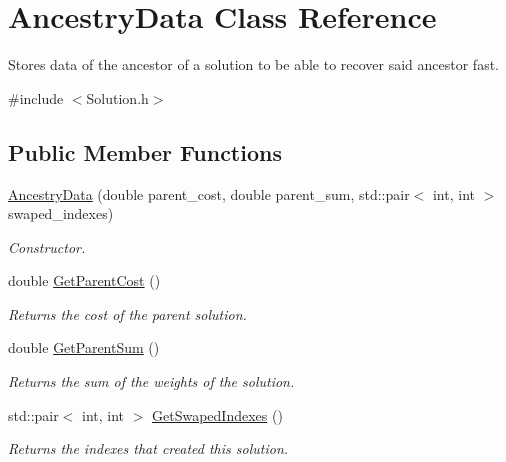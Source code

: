 \hypertarget{classAncestryData}{}\section{Ancestry\+Data Class Reference}
\label{classAncestryData}


Stores data of the ancestor of a solution to be able to recover said ancestor fast.  




{\ttfamily \#include $<$Solution.\+h$>$}

\subsection*{Public Member Functions}
\begin{DoxyCompactItemize}
\item 
\hyperlink{classAncestryData_a89867630b9e1bb170e840ad56a4bb3c8}{Ancestry\+Data} (double parent\+\_\+cost, double parent\+\_\+sum, std\+::pair$<$ int, int $>$ swaped\+\_\+indexes)
\begin{DoxyCompactList}\small\item\em Constructor. \end{DoxyCompactList}\item 
\mbox{\label{classAncestryData_a53ed2b8fccdd86f40bc73f5af63aa601}} 
double \hyperlink{classAncestryData_a53ed2b8fccdd86f40bc73f5af63aa601}{Get\+Parent\+Cost} ()
\begin{DoxyCompactList}\small\item\em Returns the cost of the parent solution. \end{DoxyCompactList}\item 
\mbox{\label{classAncestryData_a870e44c65d574a7c85a7f08f7b5c070b}} 
double \hyperlink{classAncestryData_a870e44c65d574a7c85a7f08f7b5c070b}{Get\+Parent\+Sum} ()
\begin{DoxyCompactList}\small\item\em Returns the sum of the weights of the solution. \end{DoxyCompactList}\item 
\mbox{\label{classAncestryData_a73f676c2605f0c0279dd8e9793df74e7}} 
std\+::pair$<$ int, int $>$ \hyperlink{classAncestryData_a73f676c2605f0c0279dd8e9793df74e7}{Get\+Swaped\+Indexes} ()
\begin{DoxyCompactList}\small\item\em Returns the indexes that created this solution. \end{DoxyCompactList}\end{DoxyCompactItemize}


